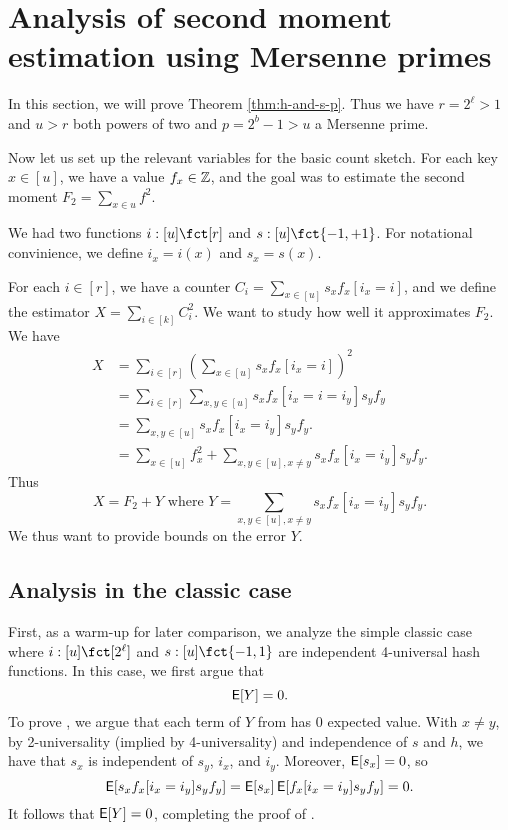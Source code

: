 


\section{Analysis of second moment estimation using  Mersenne primes}\label{sec:analysis-two-for-one}
In this section, we will prove Theorem \ref{thm:h-and-s-p}.  Thus we
have $r=2^\ell>1$ and $u>r$ both powers of two and $p=2^b-1>u$ a
Mersenne prime.

Now let us set up the relevant variables for the basic count sketch.
For each key $x\in [u]$, we have a value $f_x\in \mathbb Z$, and the
goal was to estimate the second moment $F_2=\sum_{x\in u}f^2$.

We had two functions $i:[u]\fct[r]$ and $s:[u]\fct\{-1,+1\}$. 
For notational convinience, we define $i_x=i(x)$ and $s_x=s(x)$.

For each $i\in [r]$, we have a counter 
$C_i=\sum_{x\in[u]} s_x f_x[i_x=i]$, and we define the 
estimator $X=\sum_{i\in[k]} C_i^2$. We want to study how
well it approximates $F_2$.
We have 
\begin{align*}
X&=\sum_{i\in[r]}\left( \sum_{x\in[u]}s_x f_x[i_x=i]\right)^2\\
&=\sum_{i\in[r]}\sum_{x,y\in[u]}s_x f_x[i_x=i=i_y]s_y f_y\\
&=\sum_{x,y\in[u]}s_x f_x[i_x=i_y]s_y f_y.\\
&=\sum_{x\in[u]} f_x^2+\sum_{x,y\in[u],x\neq y}
s_x f_x[i_x=i_y]s_y f_y.
\end{align*}
Thus 
\begin{equation}\label{eq:decomp}
X=F_2+Y\mbox{ where }Y=\sum_{x,y\in[u],x\neq y}
s_x f_x[i_x=i_y]s_y f_y.
\end{equation}
We thus want to provide bounds on the error $Y$.

\subsection{Analysis in the classic case}
First, as a warm-up for later comparison, we analyze the simple classic case
where $i:[u]\fct[2^\ell]$ and
$s:[u]\fct\{-1,1\}$ are independent 4-universal hash
functions. In this case, we first argue that 
\begin{equation}\label{eq:mean}
\operatorname*{\sf{E}}[Y]=0.
\end{equation}
To prove , we argue that each term of
$Y$ from  has 0 expected value. With $x\neq y$, by 2-universality (implied by 4-universality) and independence of $s$ and $h$, we have that $s_x$ is independent of $s_y$, $i_x$, and $i_y$.
Moreover, $\operatorname*{\sf{E}}[s_x]=0$, 
so 
\[\operatorname*{\sf{E}}[s_x f_x[i_x=i_y]s_y f_y]=\operatorname*{\sf{E}}[s_x]\operatorname*{\sf{E}}[f_x[i_x=i_y]s_y f_y]=0.\]
It follows that $\operatorname*{\sf{E}}[Y]=0$, completing the proof of .

